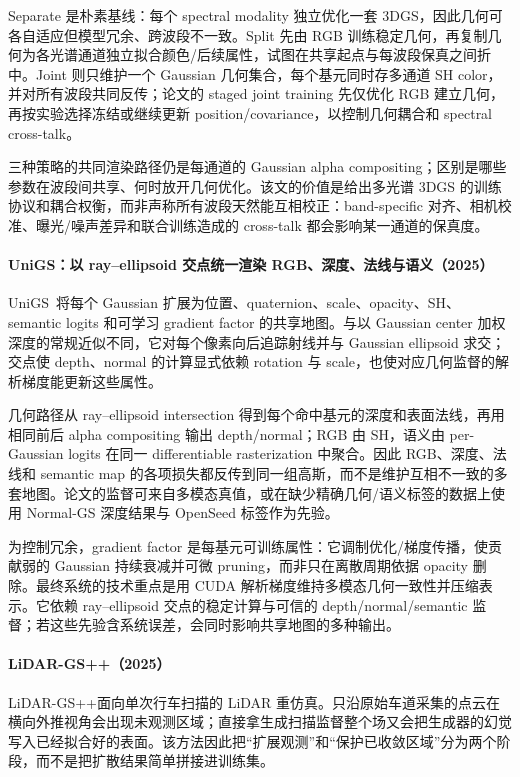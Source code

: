 Separate 是朴素基线：每个 spectral modality 独立优化一套 3DGS，因此几何可各自适应但模型冗余、跨波段不一致。Split 先由 RGB 训练稳定几何，再复制几何为各光谱通道独立拟合颜色/后续属性，试图在共享起点与每波段保真之间折中。Joint 则只维护一个 Gaussian 几何集合，每个基元同时存多通道 SH color，并对所有波段共同反传；论文的 staged joint training 先仅优化 RGB 建立几何，再按实验选择冻结或继续更新 position/covariance，以控制几何耦合和 spectral cross-talk。

三种策略的共同渲染路径仍是每通道的 Gaussian alpha compositing；区别是哪些参数在波段间共享、何时放开几何优化。该文的价值是给出多光谱 3DGS 的训练协议和耦合权衡，而非声称所有波段天然能互相校正：band-specific 对齐、相机校准、曝光/噪声差异和联合训练造成的 cross-talk 都会影响某一通道的保真度。

\paragraph{UniGS：以 ray--ellipsoid 交点统一渲染 RGB、深度、法线与语义（2025）\cite{2510_12174}}
UniGS~\cite{2510_12174}将每个 Gaussian 扩展为位置、quaternion、scale、opacity、SH、semantic logits 和可学习 gradient factor 的共享地图。与以 Gaussian center 加权深度的常规近似不同，它对每个像素向后追踪射线并与 Gaussian ellipsoid 求交；交点使 depth、normal 的计算显式依赖 rotation 与 scale，也使对应几何监督的解析梯度能更新这些属性。

几何路径从 ray--ellipsoid intersection 得到每个命中基元的深度和表面法线，再用相同前后 alpha compositing 输出 depth/normal；RGB 由 SH，语义由 per-Gaussian logits 在同一 differentiable rasterization 中聚合。因此 RGB、深度、法线和 semantic map 的各项损失都反传到同一组高斯，而不是维护互相不一致的多套地图。论文的监督可来自多模态真值，或在缺少精确几何/语义标签的数据上使用 Normal-GS 深度结果与 OpenSeed 标签作为先验。

为控制冗余，gradient factor 是每基元可训练属性：它调制优化/梯度传播，使贡献弱的 Gaussian 持续衰减并可微 pruning，而非只在离散周期依据 opacity 删除。最终系统的技术重点是用 CUDA 解析梯度维持多模态几何一致性并压缩表示。它依赖 ray--ellipsoid 交点的稳定计算与可信的 depth/normal/semantic 监督；若这些先验含系统误差，会同时影响共享地图的多种输出。

\paragraph{LiDAR-GS++（2025）\cite{2511_12304}}
LiDAR-GS++面向单次行车扫描的 LiDAR 重仿真。只沿原始车道采集的点云在横向外推视角会出现未观测区域；直接拿生成扫描监督整个场又会把生成器的幻觉写入已经拟合好的表面。该方法因此把“扩展观测”和“保护已收敛区域”分为两个阶段，而不是把扩散结果简单拼接进训练集。

